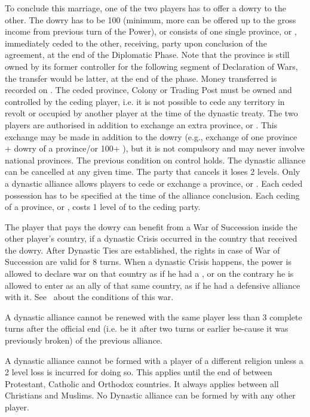 \bparag To conclude this marriage, one of the two players has to offer a dowry
to the other. The dowry has to be 100 \ducats (minimum, more can be offered up
to the gross income from previous turn of the Power), or consists of one
single province, \COL or \TP, immediately ceded to the other, receiving, party
upon conclusion of the agreement, at the end of the Diplomatic Phase. Note
that the province is still owned by its former controller for the following
segment of Declaration of Wars, the transfer would be latter, at the end of
the phase.
\bparag Money transferred is recorded on .
\bparag The ceded province, Colony or Trading Post must be owned and
controlled by the ceding player, i.e. it is not possible to cede any territory
in revolt or occupied by another player at the time of the dynastic treaty.
\bparag
The two players are authorised in addition to exchange an extra province, \COL
or \TP. This exchange may be made in addition to the dowry (e.g., exchange of
one province + dowry of a province/or 100+ \ducats), but it is not compulsory
and may never involve national provinces. The previous condition on control
holds.
\bparag
The dynastic alliance can be cancelled at any given time. The party that
cancels it loses 2 \STAB levels.
\bparag
Only a dynastic alliance allows players to cede or exchange a province, \COL
or \TP. Each ceded possession has to be specified at the time of the alliance
conclusion.
\bparag Each ceding of a province, \COL or \TP, costs 1 level of \STAB to the
ceding party.

\label{chDiplo:succession}
The player that pays the dowry can benefit from a War of Succession inside the
other player's country, if a dynastic Crisis occurred in the country that
received the dowry. After Dynastic Ties are established, the rights in case of
War of Succession are valid for 8 turns. When a dynastic Crisis happens, the
power is allowed to declare war on that country as if he had a \CB, or on the
contrary he is allowed to enter as an ally of that same country, as if he had
a defensive alliance with it. See~ about
the conditions of this war.

\bparag A dynastic alliance cannot be renewed with the same player less than 3
complete turns after the official end (i.e. be it after two turns or earlier
be-cause it was previously broken) of the previous alliance.

\bparag A dynastic alliance cannot be formed with a player of a different
religion unless a 2 \STAB level loss is incurred for doing so. This applies
until the end of  between Protestant, Catholic and
Orthodox countries. It always applies between all Christians and Muslims.
\bparag%
No Dynastic alliance can be formed by \TUR with any other player.

